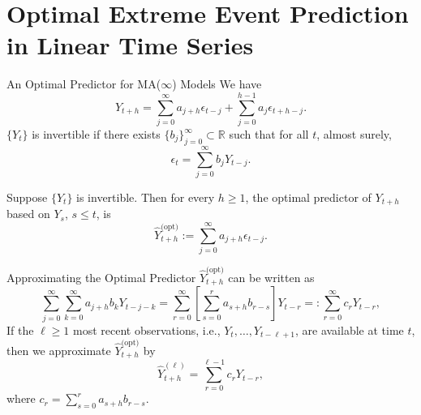\documentclass{beamer}
\def\R{\mathbb R}
\newcommand\Fi[1]{F_{#1}^{\leftarrow}}
\newcommand{\pred}[1]{\hat{Y}_{t + h}^{\text{(#1)}}}
\begin{document}
\section{Optimal Extreme Event Prediction in Linear Time Series}


\begin{frame}{An Optimal Predictor for MA($\infty$) Models}
    We have
    \[
    Y_{t + h}    
    = \sum_{j = 0}^{\infty} a_{j + h}\epsilon_{t - j} + \sum_{j = 0}^{h - 1} a_j\epsilon_{t + h - j}.
    \]
    $\{Y_t\}$ is invertible if there exists $\{b_j\}_{j = 0}^{\infty} \subset \R$ such that for all $t$, almost surely,
    \[
    \epsilon_t = \sum_{j = 0}^{\infty} b_j Y_{t - j}.
    \]

    \begin{theorem}
        Suppose $\{Y_t\}$ is invertible. Then for every $h \ge 1$, the optimal predictor of $Y_{t + h}$ based on $Y_s$, $s \le t$, is
        \[
        \pred{opt} := \sum_{j = 0}^{\infty} a_{j + h}\epsilon_{t - j}.
        \]
    \end{theorem}
\end{frame}

\begin{frame}{Approximating the Optimal Predictor}
    $\pred{opt}$ can be written as
    \[
    \sum_{j = 0}^{\infty} \sum_{k = 0}^{\infty} a_{j + h}b_k Y_{t - j - k} = \sum_{r = 0}^{\infty}\left[\sum_{s = 0}^r a_{s + h}b_{r - s}\right]Y_{t - r}
    =: \sum_{r = 0}^{\infty} c_r Y_{t - r},
    \]
    If the $\ell \ge 1$ most recent observations, i.e., $Y_t, \ldots, Y_{t - \ell + 1}$, are available at time $t$, then we approximate $\pred{opt}$ by
    \[
    \widehat{Y}_{t + h}^{(\ell)} = \sum_{r = 0}^{\ell - 1} c_r Y_{t - r},
    \]
    where $c_r = \sum_{s = 0}^r a_{s + h}b_{r - s}$.
\end{frame}
\end{document}
